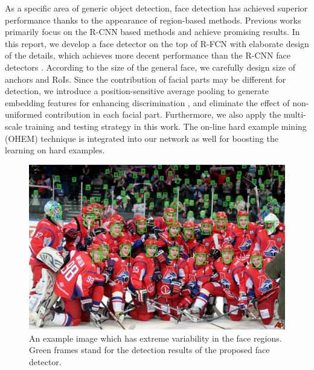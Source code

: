 \documentclass{article} %
\newcommand{\ignore}[1]{}
\begin{document}
As a specific area of generic object detection, face detection has achieved superior\ignore{high} performance thanks to\ignore{due to} the appearance\ignore{applying } of region-based methods. Previous works primarily\ignore{mainly} focus on the R-CNN based methods and achieve\ignore{making for} promising results. In this report, we develop a face detector on the top of R-FCN with elaborate design of the details, which achieves more decent performance than the R-CNN face detectors \cite{facefrcnn, facercnn}. According to the size of the general face, we carefully design size of anchors and RoIs. Since \ignore{that} the contribution of facial parts may be different for detection, we introduce a position-sensitive average pooling to generate embedding features for enhancing discrimination \ignore{to inject embedding in the feature}, and eliminate\ignore{eliminating} the effect of non-uniformed contribution in each facial part\ignore{part}.
Furthermore, we also apply\ignore{employ and} the multi-scale training and testing strategy in this work. The on-line hard example mining (OHEM) technique \cite{OHEM} is\ignore{also adopted} integrated into our network as well for boosting the learning on hard examples.\ignore{improving performance}

 


\begin{figure}
  \centering
  \includegraphics[width=13cm, keepaspectratio]{Face-RFCN-demo.png}
  \caption{An example image which has extreme variability in the face regions. Green frames stand for the detection results of the proposed face detector.}\label{1}
\end{figure}
\end{document}
